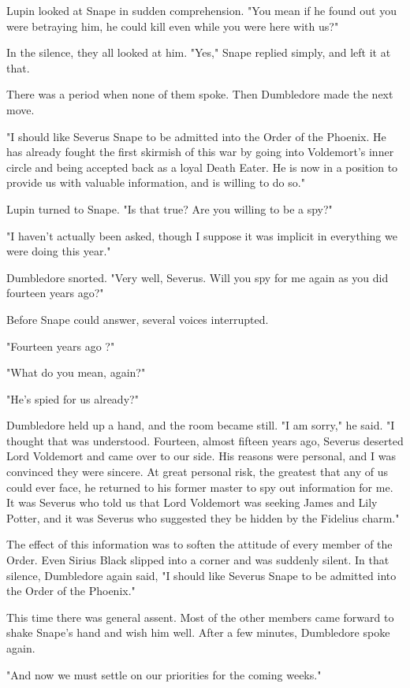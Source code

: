 Lupin looked at Snape in sudden comprehension. "You mean if he found out you were betraying him, he could kill even while you were here with us?"

In the silence, they all looked at him. "Yes," Snape replied simply, and left it at that.

There was a period when none of them spoke. Then Dumbledore made the next move.

"I should like Severus Snape to be admitted into the Order of the Phoenix. He has already fought the first skirmish of this war by going into Voldemort's inner circle and being accepted back as a loyal Death Eater. He is now in a position to provide us with valuable information, and is willing to do so."

Lupin turned to Snape. "Is that true? Are you willing to be a spy?"

"I haven't actually been asked, though I suppose it was implicit in everything we were doing this year."

Dumbledore snorted. "Very well, Severus. Will you spy for me again as you did fourteen years ago?"

Before Snape could answer, several voices interrupted.

"Fourteen years ago{\el} ?"

"What do you mean, again?"

"He's spied for us already?"

Dumbledore held up a hand, and the room became still. "I am sorry," he said. "I thought that was understood. Fourteen, almost fifteen years ago, Severus deserted Lord Voldemort and came over to our side. His reasons were personal, and I was convinced they were sincere. At great personal risk, the greatest that any of us could ever face, he returned to his former master to spy out information for me. It was Severus who told us that Lord Voldemort was seeking James and Lily Potter, and it was Severus who suggested they be hidden by the Fidelius charm."

The effect of this information was to soften the attitude of every member of the Order. Even Sirius Black slipped into a corner and was suddenly silent. In that silence, Dumbledore again said, "I should like Severus Snape to be admitted into the Order of the Phoenix."

This time there was general assent. Most of the other members came forward to shake Snape's hand and wish him well. After a few minutes, Dumbledore spoke again.

"And now we must settle on our priorities for the coming weeks."

